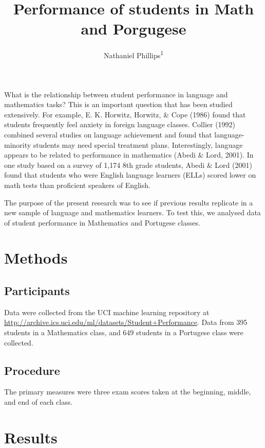 \documentclass[english,floatsintext,man]{apa6}
\title{Performance of students in Math and Porgugese}
\author{Nathaniel Phillips\textsuperscript{1}}
\affiliation{
    \vspace{0.5cm}
          \textsuperscript{1} University of Basel  }
\begin{document}
\maketitle

\setcounter{secnumdepth}{0}



What is the relationship between student performance in language and
mathematics tasks? This is an important question that has been studied
extensively. For example, E. K. Horwitz, Horwitz, \& Cope (1986) found
that students frequently feel anxiety in foreign language classes.
Collier (1992) combined several studies on language achievement and
found that language-minority students may need special treatment plans.
Interestingly, language appears to be related to performance in
mathematics (Abedi \& Lord, 2001). In one study based on a survey of
1,174 8th grade students, Abedi \& Lord (2001) found that students who
were English language learners (ELLs) scored lower on math tests than
proficient speakers of English.

The purpose of the present research was to see if previous results
replicate in a new sample of language and mathematics learners. To test
this, we analysed data of student performance in Mathematics and
Portugese classes.

\section{Methods}\label{methods}

\subsection{Participants}\label{participants}

Data were collected from the UCI machine learning repository at
\url{http://archive.ics.uci.edu/ml/datasets/Student+Performance}. Data
from 395 students in a Mathematics class, and 649 students in a
Portugese class were collected.

\subsection{Procedure}\label{procedure}

The primary measures were three exam scores taken at the beginning,
middle, and end of each class.

\section{Results}\label{results}
\end{document}
